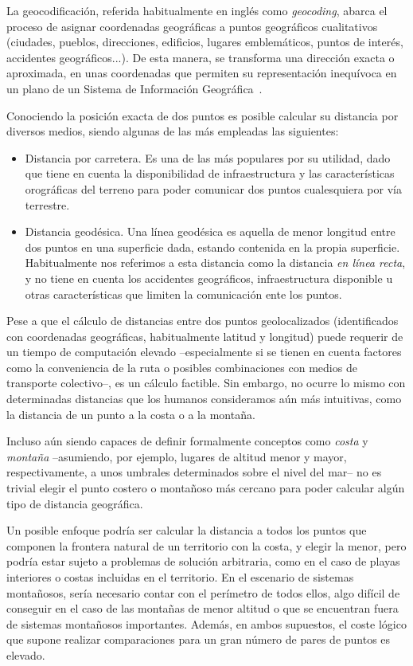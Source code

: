 La geocodificación, referida habitualmente en inglés como \textit{geocoding}, abarca el proceso de asignar coordenadas geográficas a puntos geográficos cualitativos (ciudades, pueblos, direcciones, edificios, lugares emblemáticos, puntos de interés, accidentes geográficos...). De esta manera, se transforma una dirección exacta o aproximada, en unas coordenadas que permiten su representación inequívoca en un plano de un Sistema de Información Geográfica~\cite{geocodificacion}.

Conociendo la posición exacta de dos puntos es posible calcular su distancia por diversos medios, siendo algunas de las más empleadas las siguientes:

\begin{itemize}
    \item Distancia por carretera. Es una de las más populares por su utilidad, dado que tiene en cuenta la disponibilidad de infraestructura y las características orográficas del terreno para poder comunicar dos puntos cualesquiera por vía terrestre.
    \item Distancia geodésica. Una línea geodésica es aquella de menor longitud entre dos puntos en una superficie dada, estando contenida en la propia superficie. Habitualmente nos referimos a esta distancia como la distancia \textit{en línea recta}, y no tiene en cuenta los accidentes geográficos, infraestructura disponible u otras características que limiten la comunicación ente los puntos.
\end{itemize}

Pese a que el cálculo de distancias entre dos puntos geolocalizados (identificados con coordenadas geográficas, habitualmente latitud y longitud) puede requerir de un tiempo de computación elevado –especialmente si se tienen en cuenta factores como la conveniencia de la ruta o posibles combinaciones con medios de transporte colectivo–, es un cálculo factible. Sin embargo, no ocurre lo mismo con determinadas distancias que los humanos consideramos aún más intuitivas, como la distancia de un punto a la costa o a la montaña.

Incluso aún siendo capaces de definir formalmente conceptos como \textit{costa} y \textit{montaña} –asumiendo, por ejemplo, lugares de altitud menor y mayor, respectivamente, a unos umbrales determinados sobre el nivel del mar– no es trivial elegir el punto costero o montañoso más cercano para poder calcular algún tipo de distancia geográfica.

Un posible enfoque podría ser calcular la distancia a todos los puntos que componen la frontera natural de un territorio con la costa, y elegir la menor, pero podría estar sujeto a problemas de solución arbitraria, como en el caso de playas interiores o costas incluidas en el territorio. En el escenario de sistemas montañosos, sería necesario contar con el perímetro de todos ellos, algo difícil de conseguir en el caso de las montañas de menor altitud o que se encuentran fuera de sistemas montañosos importantes. Además, en ambos supuestos, el coste lógico que supone realizar comparaciones para un gran número de pares de puntos es elevado.

